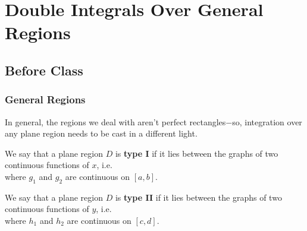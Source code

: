 \documentclass[notes]{subfiles}
\begin{document}
	\fancyhead[LO,RE]{\bfseries \small \currentname}
	\fancyfoot[C]{{}}
	\fancyfoot[RO,LE]{\large \thepage}	%
	
\section*{Double Integrals Over General Regions}\label{cs152}
	\subsection*{Before Class}
	
		\subsubsection*{General Regions}

			In general, the regions we deal with aren't perfect rectangles$-$so, integration over any plane region needs to be cast in a different light.

			\begin{defn}
				We say that a plane region $D$ is \textbf{type I} if it lies between the graphs of two continuous functions of $x$, i.e.\\[20pt]

				where $g_1$ and $g_2$ are continuous on $[a,b]$.
			\end{defn}

			\begin{defn}
				We say that a plane region $D$ is \textbf{type II} if it lies between the graphs of two continuous functions of $y$, i.e.\\[20pt]

				where $h_1$ and $h_2$ are continuous on $[c,d]$.
			\end{defn}
			
\end{document}

